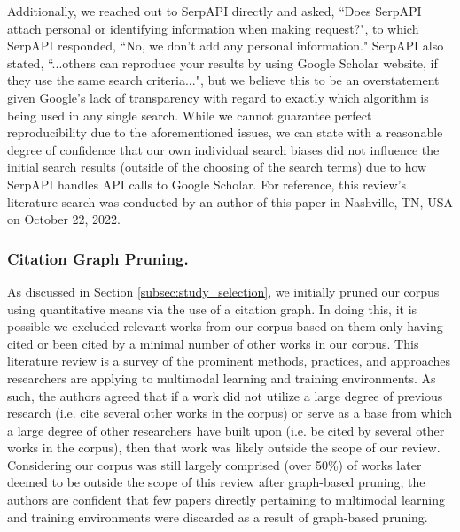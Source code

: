 \documentclass[manuscript,screen,review]{acmart}
\begin{document}
Additionally, we reached out to SerpAPI directly and asked, ``Does SerpAPI attach personal or identifying information when making request?", to which SerpAPI responded, ``No, we don't add any personal information." SerpAPI also stated, ``...others can reproduce your results by using Google Scholar website, if they use the same search criteria...", but we believe this to be an overstatement given Google's lack of transparency with regard to exactly which algorithm is being used in any single search. While we cannot guarantee perfect reproducibility due to the aforementioned issues, we can state with a reasonable degree of confidence that our own individual search biases did not influence the initial search results (outside of the choosing of the search terms) due to how SerpAPI handles API calls to Google Scholar. For reference, this review's literature search was conducted by an author of this paper in Nashville, TN, USA on October 22, 2022.

\subsubsection{Citation Graph Pruning.} 

As discussed in Section \ref{subsec:study_selection}, we initially pruned our corpus using quantitative means via the use of a citation graph. In doing this, it is possible we excluded relevant works from our corpus based on them only having cited or been cited by a minimal number of other works in our corpus. This literature review is a survey of the prominent methods, practices, and approaches researchers are applying to multimodal learning and training environments. As such, the authors agreed that if a work did not utilize a large degree of previous research (i.e. cite several other works in the corpus) or serve as a base from which a large degree of other researchers have built upon (i.e. be cited by several other works in the corpus), then that work was likely outside the scope of our review. Considering our corpus was still largely comprised (over 50\%) of works later deemed to be outside the scope of this review after graph-based pruning, the authors are confident that few papers directly pertaining to multimodal learning and training environments were discarded as a result of graph-based pruning.
\end{document}
